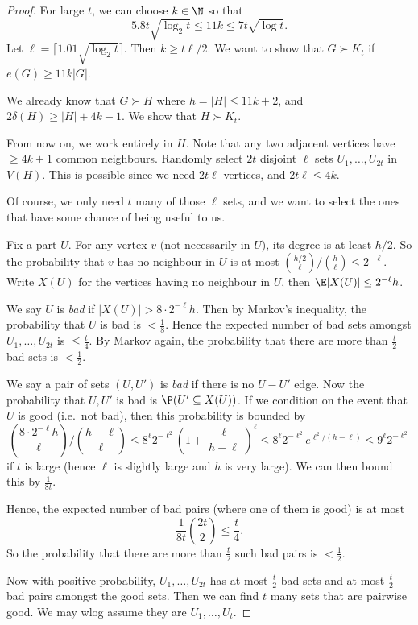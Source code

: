 \documentclass[a4paper]{article}
\begin{document}
\begin{proof}
  For large $t$, we can choose $k \in \N$ so that
  \[
    5.8t \sqrt{\log_2 t} \leq 11k \leq 7t \sqrt{\log t}.
  \]
  Let $\ell = \lceil 1.01 \sqrt{\log_2 t}\rceil$. Then $k \geq t\ell/2$. We want to show that $G \succ K_t$ if $e(G) \geq 11k |G|$.

  We already know that $G \succ H$ where $h = |H| \leq 11k + 2$, and $2 \delta(H) \geq |H| + 4k - 1$. We show that $H \succ K_t$.

  From now on, we work entirely in $H$. Note that any two adjacent vertices have $\geq 4k + 1$ common neighbours. Randomly select $2t$ disjoint $\ell$ sets $U_1, \ldots, U_{2t}$ in $V(H)$. This is possible since we need $2t \ell$ vertices, and $2t\ell \leq 4k$.

  Of course, we only need $t$ many of those $\ell$ sets, and we want to select the ones that have some chance of being useful to us.

  Fix a part $U$. For any vertex $v$ (not necessarily in $U$), its degree is at least $h/2$. So the probability that $v$ has no neighbour in $U$ is at most $\binom{h/2}{\ell} / \binom{h}{\ell} \leq 2^{-\ell}$. Write $X(U)$ for the vertices having no neighbour in $U$, then $\E |X(U)| \leq 2^{-\ell} h$.

  We say $U$ is \emph{bad} if $|X(U)| > 8 \cdot 2^{-\ell}h$. Then by Markov's inequality, the probability that $U$ is bad is $< \frac{1}{8}$. Hence the expected number of bad sets amongst $U_1, \ldots, U_{2t}$ is $\leq \frac{t}{4}$. By Markov again, the probability that there are more than $\frac{t}{2}$ bad sets is $< \frac{1}{2}$.

  We say a pair of sets $(U, U')$ is \emph{bad} if there is no $U-U'$ edge. Now the probability that $U, U'$ is bad is $\P(U' \subseteq X(U))$. If we condition on the event that $U$ is good (i.e.\ not bad), then this probability is bounded by
  \[
    \binom{8 \cdot 2^{-\ell} h}{\ell} / \binom{h - \ell}{\ell} \leq 8^\ell 2^{-\ell^2} \left(1 + \frac{\ell}{h - \ell}\right)^\ell \leq 8^\ell 2^{-\ell^2} e^{\ell^2/(h - \ell)} \leq 9^\ell 2^{-\ell^2}
  \]
  if $t$ is large (hence $\ell$ is slightly large and $h$ is very large). We can then bound this by $\frac{1}{8t}$.

  Hence, the expected number of bad pairs (where one of them is good) is at most
  \[
    \frac{1}{8t} \binom{2t}{2} \leq \frac{t}{4}.
  \]
  So the probability that there are more than $\frac{t}{2}$ such bad pairs is $< \frac{1}{2}$.

  Now with positive probability, $U_1, \ldots, U_{2t}$ has at most $\frac{t}{2}$ bad sets and at most $\frac{t}{2}$ bad pairs amongst the good sets. Then we can find $t$ many sets that are pairwise good. We may wlog assume they are $U_1, \ldots, U_t$.


\end{proof}
\end{document}
